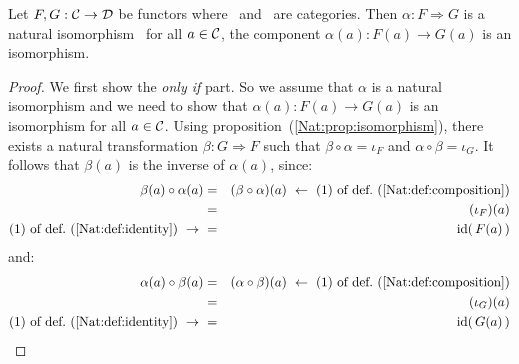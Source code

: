 \begin{prop}\label{Nat:prop:isomorphism:component}
    Let $F,G:\mbox{$\cal C$}\to\mbox{$\cal D$}$ be functors where \Cat\ and \Dat\ are categories.
    Then $\alpha:F\Rightarrow G$ is a natural isomorphism \ifand\ for
    all $a\in\mbox{$\cal C$}$, the component $\alpha(a):F(a)\to G(a)$ is an isomorphism.
\end{prop}
\begin{proof}
    We first show the {\em only if} part. So we assume that $\alpha$
    is a natural isomorphism and we need to show that $\alpha(a):F(a)\to G(a)$ 
    is an isomorphism for all $a\in\mbox{$\cal C$}$. Using
    proposition~(\ref{Nat:prop:isomorphism}), there exists a natural
    transformation $\beta:G\Rightarrow F$ such that
    $\beta\circ\alpha=\iota_{F}$ and $\alpha\circ\beta=\iota_{G}$.
    It follows that $\beta(a)$ is the inverse of $\alpha(a)$, since:
        \begin{eqnarray*}\beta(a)\circ\alpha(a)
            &=&(\beta\circ\alpha)(a)\ \leftarrow\ 
            \mbox{$(1)$ of def.~(\ref{Nat:def:composition})}\\
            &=&(\iota_{F})(a)\\
            \mbox{$(1)$ of def.~(\ref{Nat:def:identity})}\ \to\ 
            &=&\id(\,F(a)\,)
        \end{eqnarray*}
    and:
        \begin{eqnarray*}\alpha(a)\circ\beta(a)
            &=&(\alpha\circ\beta)(a)\ \leftarrow\ 
            \mbox{$(1)$ of def.~(\ref{Nat:def:composition})}\\
            &=&(\iota_{G})(a)\\
            \mbox{$(1)$ of def.~(\ref{Nat:def:identity})}\ \to\ 
            &=&\id(\,G(a)\,)
        \end{eqnarray*}
\end{proof}

%
%
